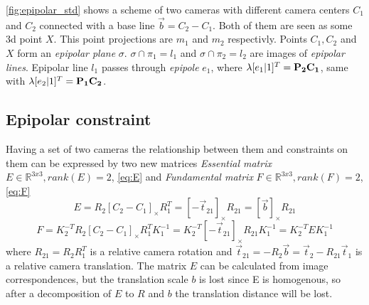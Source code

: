 \autoref{fig:epipolar_std} shows a scheme of two cameras with different camera centers $C_1$ and $C_2$ connected with a base line $\vec{b} = C_2 - C_1$. 
Both of them are seen as some 3d point $X$. 
This point projections are $m_1$ and $m_2$ respectivly. 
Points $C_1, C_2$ and $X$ form an \textit{epipolar plane} $\sigma$.
$\sigma \cap \pi_1 = l_1$ and $\sigma \cap \pi_2 = l_2$ are images of \textit{epipolar lines}. 
Epipolar line $l_1$ passes through \textit{epipole} $e_1$, where $\lambda [e_1 | 1]^T = \bf{P_2} C_1$, same with $\lambda [e_2 | 1]^T = \bf{P_1} C_2$.

\subsection{Epipolar constraint}

Having a set of two cameras the relationship between them and constraints on them can be expressed by two new matrices \textit{Essential matrix} $E \in \mathbb{R}^{3x3}, rank(E) = 2$, \autoref{eq:E} and \textit{Fundamental matrix} $F \in \mathbb{R}^{3x3}, rank(F) = 2$, \autoref{eq:F}
\begin{equation}
    \label{eq:E}
    E = R_2 [C_2 - C_1]_{\times} R_1^T = [-\vec{t}_{21}]_{\times}R_{21} = [\vec{b}]_{\times} R_{21}
\end{equation}
\begin{equation}
    \label{eq:F}
    F = K_2^{-T} R_2 [C_2 - C_1]_{\times} R_1^T K_1^{-1} = K_2^{-T} [-\vec{t}_{21}]_{\times} R_{21} K_1^{-1} = K_2^{-T} E K_1^{-1}
\end{equation}
where 
$R_{21} = R_2 R_1^T$ is a relative camera rotation and 
$\vec{t}_{21} = -R_2 \vec{b} = \vec{t}_2 - R_{21}\vec{t}_1$ is a relative camera translation.
The matrix $E$ can be calculated from image correspondences, but the translation scale $b$ is lost since E is homogenous, so after a decomposition of $E$ to $R$ and $b$ the translation distance will be lost.

